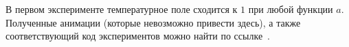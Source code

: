 В первом эксперименте температурное поле сходится к $1$ при любой функции $a$.
Полученные анимации (которые невозможно привести здесь), а также
соответствующий код экспериментов можно найти по ссылке~\cite{mesenev-github}.



%
